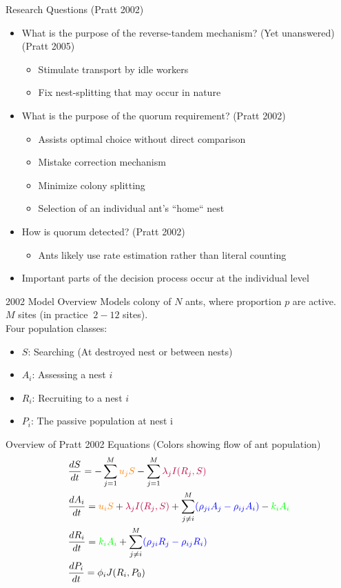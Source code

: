 \documentclass{beamer}
\makeatletter
\def\mcolor#1#{\@mcolor{#1}}
\def\@mcolor#1#2#3{%
  \protect\leavevmode
  \begingroup
    \color#1{#2}#3%
  \endgroup
}
\newcommand{\sitem}[1]
{
    \begin{itemize}
        \item #1
    \end{itemize}
}
\makeatother
\begin{document}
  \begin{frame}{Research Questions (Pratt 2002)}
      \begin{itemize}
          \item What is the purpose of the reverse-tandem mechanism? (Yet unanswered) (Pratt 2005)
              \sitem{Stimulate transport by idle workers}
              \sitem{Fix nest-splitting that may occur in nature}
          \item What is the purpose of the quorum requirement? (Pratt 2002)
              \sitem{Assists optimal choice without direct comparison}
              \sitem{Mistake correction mechanism}
              \sitem{Minimize colony splitting}
              \sitem{Selection of an individual ant's ``home`` nest}
          \item How is quorum detected? (Pratt 2002)
              \sitem{Ants likely use rate estimation rather than literal counting}
          \item Important parts of the decision process occur at the individual level
      \end{itemize}
  \end{frame}

  \begin{frame}{2002 Model Overview}
      Models colony of $N$ ants, where proportion $p$ are active. \\
      $M$ sites (in practice $~2-12$ sites). \\
      Four population classes: 
      \begin{itemize}
          \item $S$: Searching (At destroyed nest or between nests) 
          \item $A_i$: Assessing a nest $i$ 
          \item $R_i$: Recruiting to a nest $i$ 
          \item $P_i$: The passive population at nest i 
      \end{itemize}
  \end{frame}


  \begin{frame}{Overview of Pratt 2002 Equations (Colors showing flow of ant population)}
      \Large
      \begin{equation}
      \begin{aligned}
          & \frac{dS}{dt} = - \sum_{j=1}^M \mcolor{orange}{u_jS} - \sum_{j=1}^M \mcolor{purple}{\lambda_jI(R_j, S)} \\
          & \frac{dA_i}{dt} = \mcolor{orange}{u_iS} + \mcolor{purple}{\lambda_jI(R_j, S)} + \sum_{j \neq i}^M \mcolor{blue}{(\rho_{ji}A_j - \rho_{ij}A_i)} - \mcolor{green}{k_iA_i} \\
          & \frac{dR_i}{dt} = \mcolor{green}{k_iA_i} + \sum_{j \neq i}^M \mcolor{blue}{(\rho_{ji}R_j - \rho_{ij}R_i)} \\
          & \frac{dP_i}{dt} = \phi_iJ(R_i, P_0)
      \end{aligned}
      \end{equation}
  \end{frame}
\end{document}
